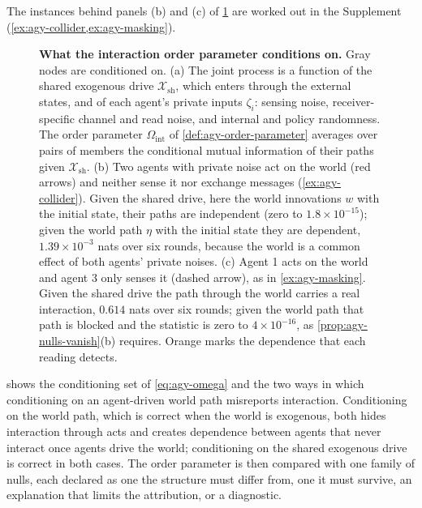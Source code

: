 The instances behind panels (b) and (c) of \cref{fig:agy-conditioning} are worked out in the Supplement (\cref{ex:agy-collider,ex:agy-masking}).

\begin{figure}[t]
  \centering
  
  \caption{\textbf{What the interaction order parameter conditions on.} Gray nodes are conditioned on. (a) The joint process is a function of the shared exogenous drive $\mathcal X_{\mathrm{sh}}$, which enters through the external states, and of each agent's private inputs $\zeta_i$: sensing noise, receiver-specific channel and read noise, and internal and policy randomness. The order parameter $\Omega_{\mathrm{int}}$ of \cref{def:agy-order-parameter} averages over pairs of members the conditional mutual information of their paths given $\mathcal X_{\mathrm{sh}}$. (b) Two agents with private noise act on the world (red arrows) and neither sense it nor exchange messages (\cref{ex:agy-collider}). Given the shared drive, here the world innovations $w$ with the initial state, their paths are independent (zero to $1.8\times10^{-15}$); given the world path $\eta$ with the initial state they are dependent, $1.39\times10^{-3}$ nats over six rounds, because the world is a common effect of both agents' private noises. (c) Agent 1 acts on the world and agent 3 only senses it (dashed arrow), as in \cref{ex:agy-masking}. Given the shared drive the path through the world carries a real interaction, $0.614$ nats over six rounds; given the world path that path is blocked and the statistic is zero to $4\times10^{-16}$, as \cref{prop:agy-nulls-vanish}(b) requires. Orange marks the dependence that each reading detects.}
  \label{fig:agy-conditioning}
\end{figure}

 shows the conditioning set of \eqref{eq:agy-omega} and the two ways in which conditioning on an agent-driven world path misreports interaction. Conditioning on the world path, which is correct when the world is exogenous, both hides interaction through acts and creates dependence between agents that never interact once agents drive the world; conditioning on the shared exogenous drive is correct in both cases. The order parameter is then compared with one family of nulls, each declared as one the structure must differ from, one it must survive, an explanation that limits the attribution, or a diagnostic.

